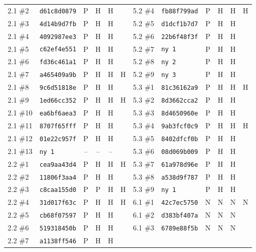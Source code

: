 {\begin{longtable}{@{}llcccc@{\hspace{2em}}llcccc@{}}
    2.1 \#2 & \texttt{d61c8d0879} & P & H & H & &
     5.2 \#4 & \texttt{fb88f799ad} & P & H & H & H \\
    2.1 \#3 & \texttt{4d14b9d7fb} & P & H & H & &
     5.2 \#5 & \texttt{d1dcf1b7d7} & P & H & H &  \\
    2.1 \#4 & \texttt{4092987ee3} & P & H & H & &
     5.2 \#6 & \texttt{22b6f48f3f} & P & H & H &  \\
    2.1 \#5 & \texttt{c62ef4e551} & P & H & H & &
     5.2 \#7 & \texttt{ny 1} & P & H & H &  \\
    2.1 \#6 & \texttt{fd36c461a1} & P & H & H & &
     5.2 \#8 & \texttt{ny 2} & P & H & H &  \\
    2.1 \#7 & \texttt{a465409a9b} & P & H & H & H &
     5.2 \#9 & \texttt{ny 3} & P & H & H &  \\
    2.1 \#8 & \texttt{9c6d51818e} & P & H & H & &
     5.3 \#1 & \texttt{81c36162a9} & P & H & H & H \\
    2.1 \#9 & \texttt{1ed66cc352} & P & H & H & H &
     5.3 \#2 & \texttt{8d3662cca2} & P & H & H &  \\
    2.1 \#10 & \texttt{ea6bf6aea3} & P & H & H & &
     5.3 \#3 & \texttt{8d4650960e} & P & H & H &  \\
    2.1 \#11 & \texttt{8707f65fff} & P & H & H & &
     5.3 \#4 & \texttt{9ab3fcf0c9} & P & H & H & H \\
    2.1 \#12 & \texttt{01e22c957f} & P & H & H & &
     5.3 \#5 & \texttt{8402dfcf0b} & P & H & H &  \\
    2.1 \#13 & \texttt{ny 1} & -- & -- & -- & &
     5.3 \#6 & \texttt{08d069b009} & P & H & H &  \\
    2.2 \#1 & \texttt{cea9aa43d4} & P & H & H & H &
     5.3 \#7 & \texttt{61a978d96e} & P & H & H &  \\
    2.2 \#2 & \texttt{11806f3aa4} & P & H & H & &
     5.3 \#8 & \texttt{a538d9f787} & P & H & H &  \\
    2.2 \#3 & \texttt{c8caa155d0} & P & P & H & H &
     5.3 \#9 & \texttt{ny 1} & P & H & H &  \\
    2.2 \#4 & \texttt{31d017f63c} & P & H & H & H &
     6.1 \#1 & \texttt{42c7ec5750} & N & N & N & N \\
    2.2 \#5 & \texttt{cb68f07597} & P & H & H & &
     6.1 \#2 & \texttt{d383bf407a} & N & N & N &  \\
    2.2 \#6 & \texttt{519318450b} & P & H & H & &
     6.1 \#3 & \texttt{6789e88f5b} & N & N & N &  \\
    2.2 \#7 & \texttt{a1138ff546} & P & H & H & &

\end{longtable}}
